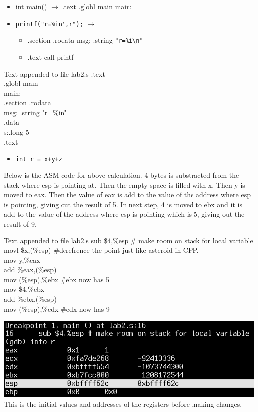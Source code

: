 \documentclass{article}
\begin{document}
\begin{itemize}
\item int main() $\rightarrow$ .text .globl main main:
\item \verb|printf("r=%in",r");| $\rightarrow$
 \begin{itemize}
 \item .section .rodata msg: .string \verb|"r=%i\n"|
 \item .text call printf
 \end{itemize}
\end{itemize}
\begin{GFT}{Text appended to file lab2.s}
\+.text\\
\+.globl main\\
\+main:\\
\+ .section .rodata\\
\+ msg: .string "r=\%i\Backslash{}n"\\
\+.data\\
\+s:.long 5\\
\+ .text\\
\end{GFT}
\clearpage





\begin{itemize}
\item \verb|int r = x+y+z| 	 
\end{itemize}
Below is the ASM code for above calculation. 4 bytes is substracted from the stack where esp is pointing at. Then the empty space is filled with x. Then y is moved to eax. Then the value of eax is add to the value of the address where esp is pointing, giving out the result of 5. In next step, 4 is moved to ebx and it is add to the value of the address where esp is pointing which is 5, giving out the result of 9.
\begin{GFT}{Text appended to file lab2.s}
\+sub \$4,\%esp \# make room on stack for local variable\\
\+movl \$x,(\%esp) \#derefrence the point just like asteroid in CPP.\\
\+mov y,\%eax\\
\+add \%eax,(\%esp)\\
\+mov (\%esp),\%ebx \#ebx now has 5\\
\+mov \$4,\%ebx\\
\+add \%ebx,(\%esp)\\
\+mov (\%esp),\%edx \#edx now has 9\\
\end{GFT}
\includegraphics[scale = 0.6]{infor1.png} \\
This is the initial values and addresses of the registers before making changes.
\clearpage
\end{document}
